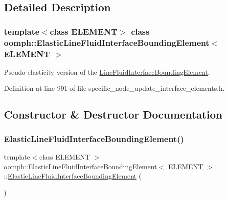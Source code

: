 \subsection{Detailed Description}
\subsubsection*{template$<$class E\+L\+E\+M\+E\+NT$>$\newline
class oomph\+::\+Elastic\+Line\+Fluid\+Interface\+Bounding\+Element$<$ E\+L\+E\+M\+E\+N\+T $>$}

Pseudo-\/elasticity version of the \hyperlink{classoomph_1_1LineFluidInterfaceBoundingElement}{Line\+Fluid\+Interface\+Bounding\+Element}. 

Definition at line 991 of file specific\+\_\+node\+\_\+update\+\_\+interface\+\_\+elements.\+h.



\subsection{Constructor \& Destructor Documentation}
\mbox{\label{classoomph_1_1ElasticLineFluidInterfaceBoundingElement_ad531b7e5debaecc74d64755c82bbc17d}} 
\subsubsection{\texorpdfstring{Elastic\+Line\+Fluid\+Interface\+Bounding\+Element()}{ElasticLineFluidInterfaceBoundingElement()}}
{\footnotesize\ttfamily template$<$class E\+L\+E\+M\+E\+NT $>$ \\
\hyperlink{classoomph_1_1ElasticLineFluidInterfaceBoundingElement}{oomph\+::\+Elastic\+Line\+Fluid\+Interface\+Bounding\+Element}$<$ E\+L\+E\+M\+E\+NT $>$\+::\hyperlink{classoomph_1_1ElasticLineFluidInterfaceBoundingElement}{Elastic\+Line\+Fluid\+Interface\+Bounding\+Element} (\begin{DoxyParamCaption}{ }\end{DoxyParamCaption})\hspace{0.3cm}{\ttfamily [inline]}}



